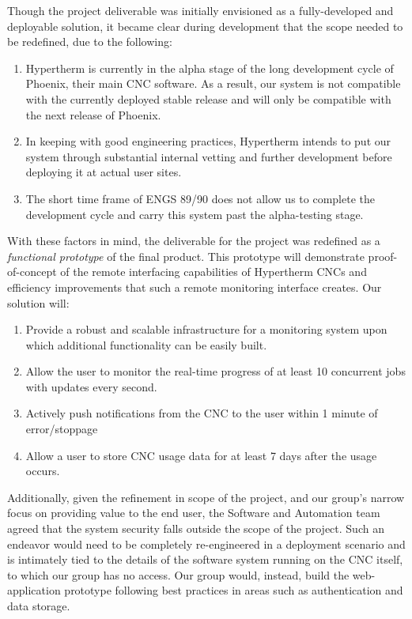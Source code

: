 \documentclass[12pt,letterpaper,titlepage]{article}
\newlength{\wideitemsep}
\let\olditem\item
\renewcommand{\item}{\setlength{\itemsep}{\wideitemsep}\olditem}
\begin{document}
Though the project deliverable was initially envisioned as a fully-developed and deployable solution, it became clear during development that the scope needed to be redefined, due to the following:
\begin{enumerate}
\item Hypertherm is currently in the alpha stage of the long development cycle of Phoenix, their main CNC software. As a result, our system is not compatible with the currently deployed stable release and will only be compatible with the next release of Phoenix.
\item In keeping with good engineering practices, Hypertherm intends to put our system through substantial internal vetting and further development before deploying it at actual user sites.
\item The short time frame of ENGS 89/90 does not allow us to complete the development cycle and carry this system past the alpha-testing stage.
\end{enumerate}

With these factors in mind, the deliverable for the project was redefined as a \textit{functional prototype} of the final product. This prototype will demonstrate proof-of-concept of the remote interfacing capabilities of Hypertherm CNCs and efficiency improvements that such a remote monitoring interface creates. Our solution will:
\begin{enumerate}
\item Provide a robust and scalable infrastructure for a monitoring system upon which additional functionality can be easily built.
\item Allow the user to monitor the real-time progress of at least 10 concurrent jobs with updates every second.
\item Actively push notifications from the CNC to the user within 1 minute of error/stoppage
\item Allow a user to store CNC usage data for at least 7 days after the usage occurs.
\end{enumerate}

Additionally, given the refinement in scope of the project, and our group's narrow focus on providing value to the end user, the Software and Automation team agreed that the system security falls outside the scope of the project. Such an endeavor would need to be completely re-engineered in a deployment scenario and is intimately tied to the details of the software system running on the CNC itself, to which our group has no access. Our group would, instead, build the web-application prototype following best practices in areas such as authentication and data storage.
\end{document}
